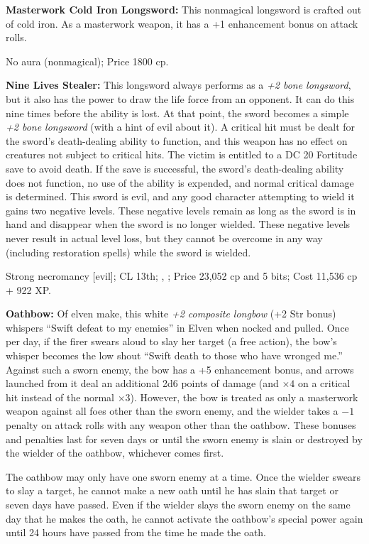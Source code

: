 \textbf{Masterwork Cold Iron Longsword:} This nonmagical longsword is crafted out of cold iron. As a masterwork weapon, it has a +1 enhancement bonus on attack rolls.

No aura (nonmagical); Price 1800 cp.

\textbf{Nine Lives Stealer:} This longsword always performs as a \emph{+2 bone longsword}, but it also has the power to draw the life force from an opponent. It can do this nine times before the ability is lost. At that point, the sword becomes a simple \emph{+2 bone longsword} (with a hint of evil about it). A critical hit must be dealt for the sword's death-dealing ability to function, and this weapon has no effect on creatures not subject to critical hits. The victim is entitled to a DC 20 Fortitude save to avoid death. If the save is successful, the sword's death-dealing ability does not function, no use of the ability is expended, and normal critical damage is determined. This sword is evil, and any good character attempting to wield it gains two negative levels. These negative levels remain as long as the sword is in hand and disappear when the sword is no longer wielded. These negative levels never result in actual level loss, but they cannot be overcome in any way (including restoration spells) while the sword is wielded.

Strong necromancy [evil]; CL 13th; , ; Price 23,052 cp and 5 bits; Cost 11,536 cp + 922 XP.

\textbf{Oathbow:} Of elven make, this white \emph{+2 composite longbow} (+2 Str bonus) whispers ``Swift defeat to my enemies'' in Elven when nocked and pulled. Once per day, if the firer swears aloud to slay her target (a free action), the bow's whisper becomes the low shout ``Swift death to those who have wronged me.'' Against such a sworn enemy, the bow has a +5 enhancement bonus, and arrows launched from it deal an additional 2d6 points of damage (and $\times4$ on a critical hit instead of the normal $\times3$). However, the bow is treated as only a masterwork weapon against all foes other than the sworn enemy, and the wielder takes a $-1$ penalty on attack rolls with any weapon other than the oathbow. These bonuses and penalties last for seven days or until the sworn enemy is slain or destroyed by the wielder of the oathbow, whichever comes first.

The oathbow may only have one sworn enemy at a time. Once the wielder swears to slay a target, he cannot make a new oath until he has slain that target or seven days have passed. Even if the wielder slays the sworn enemy on the same day that he makes the oath, he cannot activate the oathbow's special power again until 24 hours have passed from the time he made the oath.

